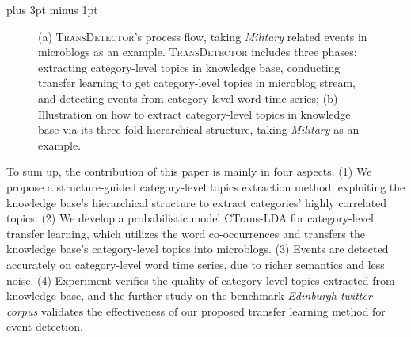 \documentclass[runningheads,a4paper]{llncs}
\theoremstyle{exampstyle}
\begin{document}
\intextsep=5pt plus 3pt minus 1pt
\begin{figure}
	\setlength{\abovecaptionskip}{0.cm}
	\setlength{\belowcaptionskip}{0.cm}
	\centering
    \label{fig:subfig} %
        \caption{(a) \textsc{TransDetector}'s process flow, taking \textit{Military} related events in microblogs as an example. \textsc{TransDetector} includes three phases: extracting category-level topics in knowledge base, conducting transfer learning to get category-level topics in microblog stream, and detecting events from category-level word time series; (b) Illustration on how to extract category-level topics in knowledge base via its three fold hierarchical structure, taking \textit{Military} as an example.}
\end{figure}

To sum up, the contribution of this paper is mainly in four aspects.
(1) We propose a structure-guided category-level topics extraction method, exploiting the knowledge base's hierarchical structure to extract categories' highly correlated topics. 
(2) We develop a probabilistic model CTrans-LDA for category-level transfer learning, which utilizes the word co-occurrences and transfers the knowledge base's category-level topics into microblogs. 
(3) Events are detected accurately on category-level word time series, due to richer semantics and less noise. 
(4) Experiment verifies the quality of category-level topics extracted from knowledge base, and the further study on the benchmark \textit{Edinburgh twitter corpus} validates the effectiveness of our proposed transfer learning method for event detection.
\end{document}
